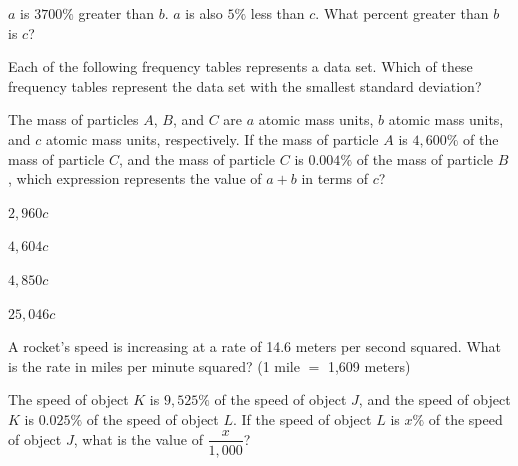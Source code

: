 \vfill
\noindent\begin{minipage}{\linewidth}
\par\smallskip
$a$ is $3700\%$ greater than $b$. $a$ is also $5\%$ less than $c$. What percent greater than $b$ is $c$?
\end{minipage}
\vfill
\noindent\begin{minipage}{\linewidth}
\par\smallskip
Each of the following frequency tables represents a data set. Which of these frequency tables represent the data set with the smallest standard deviation?
\satfig{\figtblfreqchoice}
\end{minipage}
\vfill
\clearpage
\noindent\begin{minipage}{\linewidth}
\par\smallskip
The mass of particles $A$, $B$, and $C$ are $a$ atomic mass units, $b$ atomic mass units, and $c$ atomic mass units, respectively. If the mass of particle $A$ is $4{,}600\%$ of the mass of particle $C$, and the mass of particle $C$ is $0.004\%$ of the mass of particle $B$, which expression represents the value of $a+b$ in terms of $c$?
\begin{satchoices}
  \item[A)] $2{,}960c$
  \item[B)] $4{,}604c$
  \item[C)] $4{,}850c$
  \item[D)] $25{,}046c$
\end{satchoices}
\end{minipage}
\vfill
\noindent\begin{minipage}{\linewidth}
\par\smallskip
A rocket's speed is increasing at a rate of 14.6 meters per second squared. What is the rate in miles per minute squared? (1 mile $=$ 1,609 meters)
\end{minipage}
\vfill
\noindent\begin{minipage}{\linewidth}
\par\smallskip
The speed of object $K$ is $9{,}525\%$ of the speed of object $J$, and the speed of object $K$ is $0.025\%$ of the speed of object $L$. If the speed of object $L$ is $x\%$ of the speed of object $J$, what is the value of $\dfrac{x}{1{,}000}$?
\end{minipage}
\vfill
\clearpage

